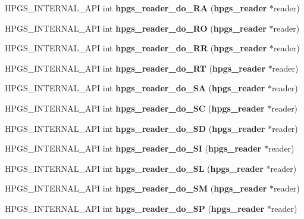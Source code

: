 \begin{DoxyCompactItemize}
\item 
HPGS\_\-INTERNAL\_\-API int {\bfseries hpgs\_\-reader\_\-do\_\-RA} ({\bf hpgs\_\-reader} $\ast$reader)\label{group__reader_ga5dc2941db3a63239f3339281e332c6f4}

\item 
HPGS\_\-INTERNAL\_\-API int {\bfseries hpgs\_\-reader\_\-do\_\-RO} ({\bf hpgs\_\-reader} $\ast$reader)\label{group__reader_gada03ea2ce58484b8b62c357e9049d914}

\item 
HPGS\_\-INTERNAL\_\-API int {\bfseries hpgs\_\-reader\_\-do\_\-RR} ({\bf hpgs\_\-reader} $\ast$reader)\label{group__reader_ga6f0e9b813af1d2525059e7ce16cf82b1}

\item 
HPGS\_\-INTERNAL\_\-API int {\bfseries hpgs\_\-reader\_\-do\_\-RT} ({\bf hpgs\_\-reader} $\ast$reader)\label{group__reader_gaf3dbd72002d495479a4eff8f3602cd0e}

\item 
HPGS\_\-INTERNAL\_\-API int {\bfseries hpgs\_\-reader\_\-do\_\-SA} ({\bf hpgs\_\-reader} $\ast$reader)\label{group__reader_ga7e0abf5b2426bd0e603828501bb36c9e}

\item 
HPGS\_\-INTERNAL\_\-API int {\bfseries hpgs\_\-reader\_\-do\_\-SC} ({\bf hpgs\_\-reader} $\ast$reader)\label{group__reader_gae3fbbafae8de8b6dea831b9bf24242d3}

\item 
HPGS\_\-INTERNAL\_\-API int {\bfseries hpgs\_\-reader\_\-do\_\-SD} ({\bf hpgs\_\-reader} $\ast$reader)\label{group__reader_gac381a958a3fa32fd544c10c225986005}

\item 
HPGS\_\-INTERNAL\_\-API int {\bfseries hpgs\_\-reader\_\-do\_\-SI} ({\bf hpgs\_\-reader} $\ast$reader)\label{group__reader_gadaad71bd774a907fde56590f017b1c3f}

\item 
HPGS\_\-INTERNAL\_\-API int {\bfseries hpgs\_\-reader\_\-do\_\-SL} ({\bf hpgs\_\-reader} $\ast$reader)\label{group__reader_ga3f43c65d53fa49d9928536e2340cc1e5}

\item 
HPGS\_\-INTERNAL\_\-API int {\bfseries hpgs\_\-reader\_\-do\_\-SM} ({\bf hpgs\_\-reader} $\ast$reader)\label{group__reader_ga141bb3fe1f17f7cdbddefef00990fd9d}

\item 
HPGS\_\-INTERNAL\_\-API int {\bfseries hpgs\_\-reader\_\-do\_\-SP} ({\bf hpgs\_\-reader} $\ast$reader)\label{group__reader_gaf6d8257afede41554e0ed06b30b8df8b}


\end{DoxyCompactItemize}

